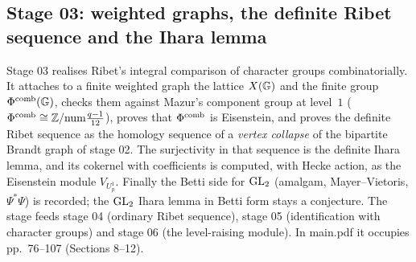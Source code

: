 \subsection{Stage 03: weighted graphs, the definite Ribet sequence and the Ihara lemma}\label{ss:stage03}

Stage 03 realises Ribet's integral comparison of character groups combinatorially. It attaches to a finite weighted graph
the lattice $X(\mathbb{G})$ and the finite group $\Phi^{\mathrm{comb}}(\mathbb{G})$, checks them against Mazur's component group at level~$1$
($\Phi^{\mathrm{comb}}\cong\mathbb{Z}/\mathrm{num}\frac{q-1}{12}$), proves that $\Phi^{\mathrm{comb}}$ is Eisenstein, and proves the definite Ribet sequence as the
homology sequence of a \emph{vertex collapse} of the bipartite Brandt graph of stage 02. The surjectivity in that sequence is the
definite Ihara lemma, and its cokernel with coefficients is computed, with Hecke action, as the Eisenstein module $V_{U^1_p}$.
Finally the Betti side for $\mathrm{GL}_2$ (amalgam, Mayer--Vietoris, $\Psi^*\Psi$) is recorded; the $\mathrm{GL}_2$ Ihara lemma in Betti
form stays a conjecture. The stage feeds stage 04 (ordinary Ribet sequence), stage 05 (identification with character groups) and stage 06
(the level-raising module). In main.pdf it occupies pp.~76--107 (Sections 8--12).

